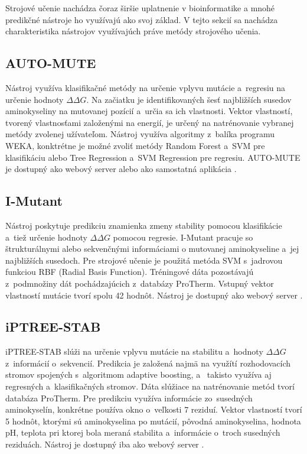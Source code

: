 Strojové učenie nachádza čoraz širšie uplatnenie v bioinformatike a mnohé predikčné nástroje ho využívajú ako svoj základ. V tejto sekcií sa nachádza charakteristika nástrojov využívajúch práve metódy strojového učenia.

\subsection{AUTO-MUTE}

Nástroj využíva klasifikačné metódy na určenie vplyvu mutácie a~regresiu na určenie hodnoty $\Delta\Delta G$.
Na začiatku je identifikovaných šesť najbližších susedov aminokyseliny na mutovanej pozícií a~určia sa ich vlastnosti. Vektor vlastností, tvorený vlastnosťami založenými na energií, je určený na natrénovanie vybranej metódy zvolenej užívateľom. Nástroj využíva algoritmy z~balíka programu WEKA, konktrétne je možné zvoliť metódy Random Forest a~SVM pre klasifikáciu alebo Tree Regression a~SVM Regression pre regresiu. AUTO-MUTE je dostupný ako webový server alebo ako samostatná aplikácia \cite{automute}.

\subsection{I-Mutant}

Nástroj poskytuje predikciu znamienka zmeny stability pomocou klasifikácie a~tiež určenie hodnoty $\Delta\Delta G$ pomocou regresie. I-Mutant pracuje so štrukturálnymi alebo sekvenčnými informáciami o mutovanej aminokyseline a~jej najbližších susedoch. Pre strojové učenie je použitá metóda SVM s~jadrovou funkciou RBF (Radial Basis Function). Tréningové dáta pozostávajú z~podmnožiny dát pochádzajúcich z~databázy ProTherm. Vstupný vektor vlastností mutácie tvorí spolu 42 hodnôt. Nástroj je dostupný ako webový server \cite{imutant}. 

\subsection{iPTREE-STAB}

iPTREE-STAB slúži na určenie vplyvu mutácie na stabilitu a~hodnoty $\Delta\Delta G$ z~informácií o~sekvencií. Predikcia je založená najmä na využítí rozhodovacích stromov spojených s~algoritmom adaptive boosting, a~ takisto využíva aj regresných a~klasifikačných stromov. Dáta slúžiace na natrénovanie metód tvorí databáza ProTherm. Pre predikciu využíva informácie zo~susedných aminokyselín, konkrétne používa okno o~veľkosti 7 reziduí. Vektor vlastností tvorí 5 hodnôt, ktorými sú aminokyselina po mutácií, pôvodná aminokyselina, hodnota pH, teplota pri ktorej bola meraná stabilita a~informácie o~troch susedných reziduách. Nástroj je dostupný iba ako webový server \cite{iptree}.

